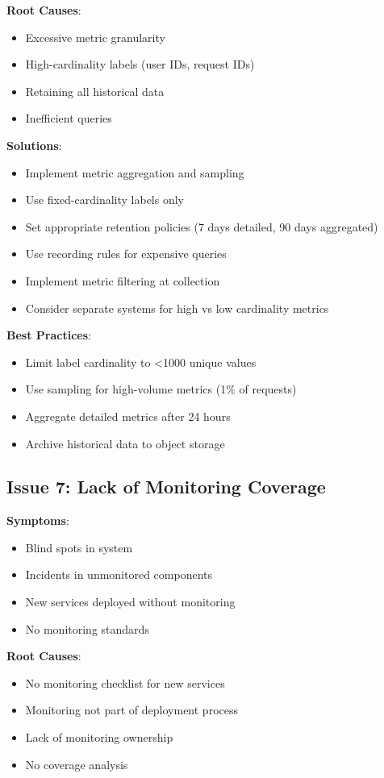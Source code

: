 \textbf{Root Causes}:
\begin{itemize}
    \item Excessive metric granularity
    \item High-cardinality labels (user IDs, request IDs)
    \item Retaining all historical data
    \item Inefficient queries
\end{itemize}

\textbf{Solutions}:
\begin{itemize}
    \item Implement metric aggregation and sampling
    \item Use fixed-cardinality labels only
    \item Set appropriate retention policies (7 days detailed, 90 days aggregated)
    \item Use recording rules for expensive queries
    \item Implement metric filtering at collection
    \item Consider separate systems for high vs low cardinality metrics
\end{itemize}

\textbf{Best Practices}:
\begin{itemize}
    \item Limit label cardinality to <1000 unique values
    \item Use sampling for high-volume metrics (1\% of requests)
    \item Aggregate detailed metrics after 24 hours
    \item Archive historical data to object storage
\end{itemize}

\subsection{Issue 7: Lack of Monitoring Coverage}

\textbf{Symptoms}:
\begin{itemize}
    \item Blind spots in system
    \item Incidents in unmonitored components
    \item New services deployed without monitoring
    \item No monitoring standards
\end{itemize}

\textbf{Root Causes}:
\begin{itemize}
    \item No monitoring checklist for new services
    \item Monitoring not part of deployment process
    \item Lack of monitoring ownership
    \item No coverage analysis
\end{itemize}

